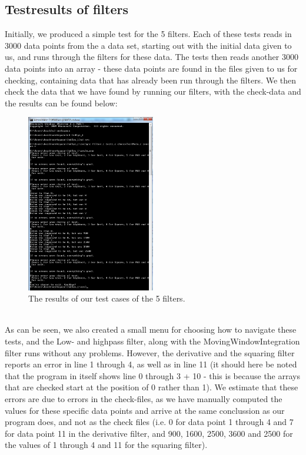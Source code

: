 \documentclass[12pt,a4paper]{article}
\begin{document}
\subsection{Testresults of filters}
Initially, we produced a simple test for the 5 filters. Each of these tests reads in 3000 data points from the a data set, starting out with the initial data given to us, and runs through the filters for these data. The tests then reads another 3000 data points into an array - these data points are found in the files given to us for checking, containing data that has already been run through the filters. We then check the data that we have found by running our filters, with the check-data and the results can be found below:
\begin{figure}[h!]
  \centering
    \includegraphics[width=0.5\textwidth]{Results_test.png}
  \caption{The results of our test cases of the 5 filters.}
\end{figure}
\\As can be seen, we also created a small menu for choosing how to navigate these tests, and the Low- and highpass filter, along with the MovingWindowIntegration filter runs without any problems. However, the derivative and the squaring filter reports an error in line 1 through 4, as well as in line 11 (it should here be noted that the program in itself shows line 0 through 3 + 10 - this is because the arrays that are checked start at the position of 0 rather than 1). We estimate that these errors are due to errors in the check-files, as we have manually computed the values for these specific data points and arrive at the same conclussion as our program does, and not as the check files (i.e. 0 for data point 1 through 4 and 7 for data point 11 in the derivative filter, and 900, 1600, 2500, 3600 and 2500 for the values of 1 through 4 and 11 for the squaring filter).
\end{document}
